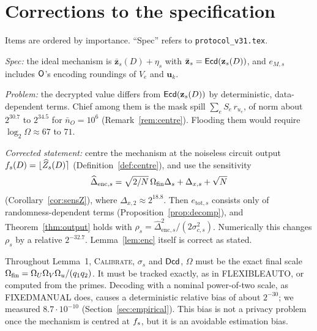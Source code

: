 \section{Corrections to the specification}
\label{sec:fix}

Items are ordered by importance. ``Spec'' refers to \texttt{protocol\_v31.tex}.

\begin{correction}\label{cor:centre}
\emph{Spec:} the ideal mechanism is $\bar{\mathbf z}_s(D)+\eta_s$ with $\bar{\mathbf z}_s=\mathsf{Ecd}(\mathbf z_s(D))$, and $e_{M,s}$ includes $\mathsf{O}$'s encoding roundings of $V_e$ and $\mathbf u_k$.

\emph{Problem:} the decrypted value differs from $\mathsf{Ecd}(\mathbf z_s(D))$ by deterministic, data-dependent terms. Chief among them is the mask spill $\sum_eS_e\,r_{u_e}$, of norm about $2^{30.7}$ to $2^{34.5}$ for $\bar n_O=10^6$ (Remark~\ref{rem:centre}). Flooding them would require $\log_2\Omega\approx67$ to $71$.

\emph{Corrected statement:} centre the mechanism at the noiseless circuit output $f_s(D)=\lfloor\widehat Z_s(D)\rceil$ (Definition~\ref{def:centre}), and use the sensitivity
\[
  \widehat\Delta_{\mathrm{enc},s}=\sqrt{2/N}\,\Omega_{\mathrm{fin}}\Delta_s+\Delta_{x,s}+\sqrt N
\]
(Corollary~\ref{cor:sensZ}), where $\Delta_{x,2}\approx2^{18.8}$. Then $e_{\mathrm{tot},s}$ consists only of randomness-dependent terms (Proposition~\ref{prop:decomp}), and Theorem~\ref{thm:output} holds with $\rho_s=\widehat\Delta_{\mathrm{enc},s}^2/(2\sigma_{c,s}^2)$. Numerically this changes $\rho_s$ by a relative $2^{-32.7}$. Lemma~\ref{lem:enc} itself is correct as stated.
\end{correction}

\begin{correction}\label{cor:scale}
Throughout Lemma~1, \textsc{Calibrate}, $\sigma_s$ and $\mathsf{Dcd}$, $\Omega$ must be the exact final scale $\Omega_{\mathrm{fin}}=\Omega_U\Omega_V\Omega_u/(q_1q_2)$. It must be tracked exactly, as in FLEXIBLEAUTO, or computed from the primes. Decoding with a nominal power-of-two scale, as FIXEDMANUAL does, causes a deterministic relative bias of about $2^{-30}$; we measured $8.7\cdot10^{-10}$ (Section~\ref{sec:empirical}). This bias is not a privacy problem once the mechanism is centred at $f_s$, but it is an avoidable estimation bias.
\end{correction}

